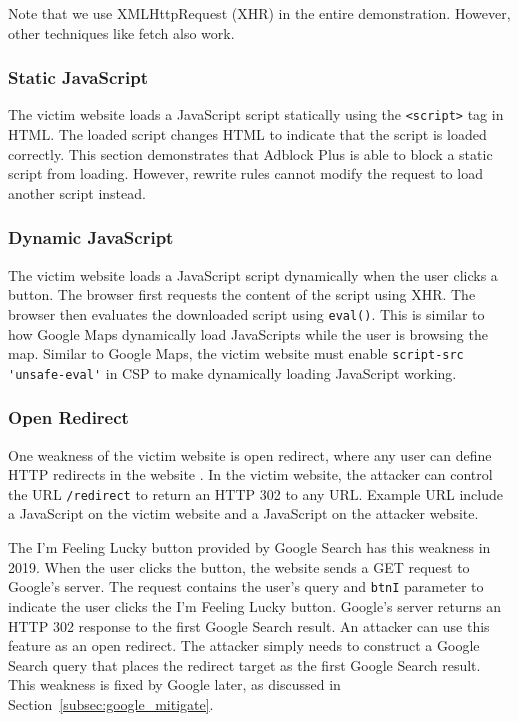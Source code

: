 \documentclass[conference]{IEEEtran}
\begin{document}
Note that we use XMLHttpRequest (XHR) in the entire demonstration. However, other techniques like fetch also work.

\subsubsection{Static JavaScript}

The victim website loads a JavaScript script statically using the \lstinline{<script>} tag in HTML. The loaded script changes HTML to indicate that the script is loaded correctly. This section demonstrates that Adblock Plus is able to block a static script from loading. However, rewrite rules cannot modify the request to load another script instead.

\subsubsection{Dynamic JavaScript}

The victim website loads a JavaScript script dynamically when the user clicks a button. The browser first requests the content of the script using XHR. The browser then evaluates the downloaded script using \lstinline{eval()}. This is similar to how Google Maps dynamically load JavaScripts while the user is browsing the map. Similar to Google Maps, the victim website must enable \lstinline{script-src 'unsafe-eval'} in CSP to make dynamically loading JavaScript working.

\subsubsection{Open Redirect}

One weakness of the victim website is open redirect, where any user can define HTTP redirects in the website \cite{cwe_open_redir}. In the victim website, the attacker can control the URL \lstinline{/redirect} to return an HTTP 302 to any URL. Example URL include a JavaScript on the victim website and a JavaScript on the attacker website.

The I'm Feeling Lucky button provided by Google Search has this weakness in 2019. When the user clicks the button, the website sends a GET request to Google's server. The request contains the user's query and \lstinline{btnI} parameter to indicate the user clicks the I'm Feeling Lucky button. Google's server returns an HTTP 302 response to the first Google Search result. An attacker can use this feature as an open redirect. The attacker simply needs to construct a Google Search query that places the redirect target as the first Google Search result. This weakness is fixed by Google later, as discussed in Section~\ref{subsec:google_mitigate}.
\end{document}
